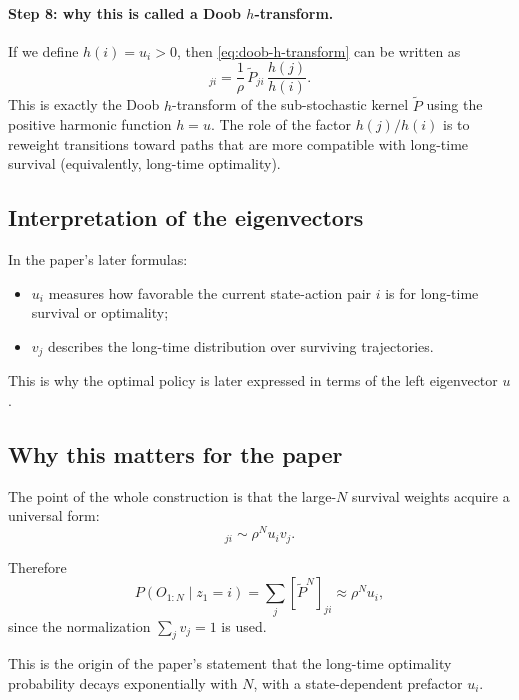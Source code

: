 \documentclass[11pt]{article}
\begin{document}
\paragraph{Step 8: why this is called a Doob \(h\)-transform.}
If we define \(h(i)=u_i>0\), then \eqref{eq:doob-h-transform} can be written as
\begin{equation}
    [P_d]_{ji}
    =
    \frac{1}{\rho}\,
    \widetilde{P}_{ji}\,
    \frac{h(j)}{h(i)}.
\end{equation}
This is exactly the Doob \(h\)-transform of the sub-stochastic kernel \(\widetilde{P}\)
using the positive harmonic function \(h=u\). The role of the factor \(h(j)/h(i)\) is to
reweight transitions toward paths that are more compatible with long-time survival
(equivalently, long-time optimality).

\subsection*{Interpretation of the eigenvectors}

In the paper's later formulas:
\begin{itemize}
    \item \(u_i\) measures how favorable the current state-action pair \(i\) is for long-time
    survival or optimality;
    \item \(v_j\) describes the long-time distribution over surviving trajectories.
\end{itemize}

This is why the optimal policy is later expressed in terms of the left eigenvector \(u\).

\subsection*{Why this matters for the paper}

The point of the whole construction is that the large-\(N\) survival weights acquire a
universal form:
\begin{equation}
    [\widetilde{P}^{N}]_{ji}\sim \rho^N u_i v_j.
\end{equation}

Therefore
\begin{equation}
    P(O_{1:N}\mid z_1=i)
    =
    \sum_j [\widetilde{P}^{N}]_{ji}
    \approx
    \rho^N u_i,
\end{equation}
since the normalization \(\sum_j v_j=1\) is used.

This is the origin of the paper's statement that the long-time optimality probability decays
exponentially with \(N\), with a state-dependent prefactor \(u_i\).
\end{document}
